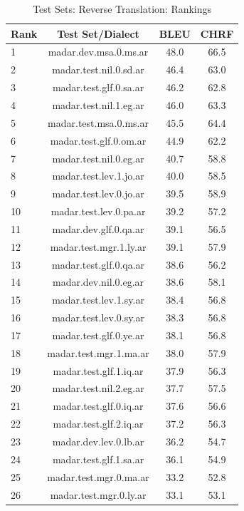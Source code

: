 \begin{table}[htbp]
\centering
\caption{Test Sets: Reverse Translation: Rankings}
\label{tab:testset_ranking_reverse}
\begin{tabular}{l@{\hspace{3pt}}c@{\hspace{3pt}}c@{\hspace{3pt}}c}
\toprule
Rank & Test Set/Dialect & BLEU & CHRF \\
\midrule
1 & madar.dev.msa.0.ms.ar & 48.0 & 66.5 \\
2 & madar.test.nil.0.sd.ar & 46.4 & 63.0 \\
3 & madar.test.glf.0.sa.ar & 46.2 & 62.8 \\
4 & madar.test.nil.1.eg.ar & 46.0 & 63.3 \\
5 & madar.test.msa.0.ms.ar & 45.5 & 64.4 \\
6 & madar.test.glf.0.om.ar & 44.9 & 62.2 \\
7 & madar.test.nil.0.eg.ar & 40.7 & 58.8 \\
8 & madar.test.lev.1.jo.ar & 40.0 & 58.5 \\
9 & madar.test.lev.0.jo.ar & 39.5 & 58.9 \\
10 & madar.test.lev.0.pa.ar & 39.2 & 57.2 \\
11 & madar.dev.glf.0.qa.ar & 39.1 & 56.5 \\
12 & madar.test.mgr.1.ly.ar & 39.1 & 57.9 \\
13 & madar.test.glf.0.qa.ar & 38.6 & 56.2 \\
14 & madar.dev.nil.0.eg.ar & 38.6 & 58.1 \\
15 & madar.test.lev.1.sy.ar & 38.4 & 56.8 \\
16 & madar.test.lev.0.sy.ar & 38.3 & 56.8 \\
17 & madar.test.glf.0.ye.ar & 38.1 & 56.8 \\
18 & madar.test.mgr.1.ma.ar & 38.0 & 57.9 \\
19 & madar.test.glf.1.iq.ar & 37.9 & 56.3 \\
20 & madar.test.nil.2.eg.ar & 37.7 & 57.5 \\
21 & madar.test.glf.0.iq.ar & 37.6 & 56.6 \\
22 & madar.test.glf.2.iq.ar & 37.2 & 56.3 \\
23 & madar.dev.lev.0.lb.ar & 36.2 & 54.7 \\
24 & madar.test.glf.1.sa.ar & 36.1 & 54.9 \\
25 & madar.test.mgr.0.ma.ar & 33.2 & 52.8 \\
26 & madar.test.mgr.0.ly.ar & 33.1 & 53.1 \\

\end{tabular}
\end{table}
